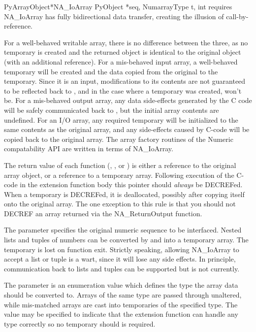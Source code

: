 \begin{cfuncdesc}{PyArrayObject*}{NA_IoArray}{%
      PyObject *seq, NumarrayType t, int requires} NA_IoArray has fully
bidirectional data transfer, creating the illusion of call-by-reference.
\end{cfuncdesc}

  For a well-behaved writable array, there is no difference between the three,
  as no temporary is created and the returned object is identical to the
  original object (with an additional reference).  For a mis-behaved input
  array, a well-behaved temporary will be created and the data copied from the
  original to the temporary.  Since it is an input, modifications to its
  contents are not guaranteed to be reflected back to \python, and in the case
  where a temporary was created, won't be.  For a mis-behaved output array, any
  data side-effects generated by the C code will be safely communicated back to
  \python, but the initial array contents are undefined.  For an I/O array, any
  required temporary will be initialized to the same contents as the original
  array, and any side-effects caused by C-code will be copied back to the
  original array.  The array factory routines of the Numeric compatability API
  are written in terms of NA_IoArray.
   
   The return value of each function (,
   , or ) is either a reference
   to the original array object, or a reference to a temporary array.
   Following execution of the C-code in the extension function body this
   pointer should \emph{always} be DECREFed.  When a temporary is DECREFed, it
   is deallocated, possibly after copying itself onto the original array.  The
   one exception to this rule is that you should not DECREF an array returned
   via the NA_ReturnOutput function.
   
   The  parameter specifies the original numeric sequence to be
   interfaced.  Nested lists and tuples of numbers can be converted by
    and  into a temporary array.
   The temporary is lost on function exit.  Strictly speaking, allowing
   NA_IoArray to accept a list or tuple is a wart, since it will lose any side
   effects.  In principle, communication back to lists and tuples can be
   supported but is not currently.
   
   The  parameter is an enumeration value which defines the type the
   array data should be converted to.  Arrays of the same type are passed
   through unaltered, while mis-matched arrays are cast into temporaries of the
   specified type.  The value  may be specified to indicate that
   the extension function can handle any type correctly so no temporary should
   is required.
   
